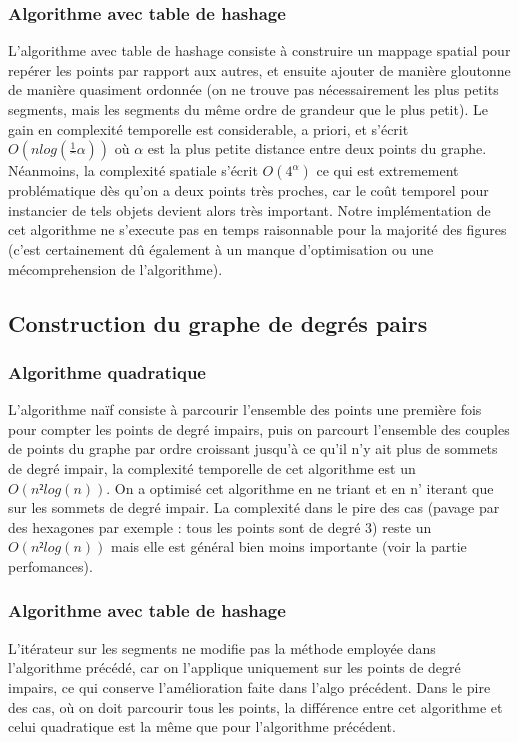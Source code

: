 \documentclass[a4paper,11pt]{article}
\begin{document}
\subsubsection{Algorithme avec table de hashage}

L'algorithme avec table de hashage consiste à construire un mappage spatial pour repérer les points par rapport
aux autres, et ensuite ajouter de manière gloutonne de manière quasiment ordonnée (on ne trouve pas nécessairement
les plus petits segments, mais les segments du même ordre de grandeur que le plus petit). Le gain en complexité temporelle
est considerable, a priori, et s'écrit $O(nlog(\frac{1}^{\alpha}))$ où $\alpha$ est la plus petite distance entre deux points du graphe.
Néanmoins, la complexité spatiale s'écrit $O(4^{\alpha})$ ce qui est extremement problématique dès qu'on a deux points très proches,
car le coût temporel pour instancier de tels objets devient alors très important.
Notre implémentation de cet algorithme ne s'execute pas en temps raisonnable pour la majorité des figures (c'est certainement dû
également à un manque d'optimisation ou une mécomprehension de l'algorithme).
\subsection{Construction du graphe de degrés pairs}

\subsubsection{Algorithme quadratique}

L'algorithme naïf consiste à parcourir l'ensemble des points une première fois pour compter les points de degré impairs,
puis on parcourt l'ensemble des couples de points du graphe par ordre croissant jusqu'à ce qu'il n'y ait plus de sommets de
degré impair, la complexité temporelle de cet algorithme est un $O(n²log(n))$. On a optimisé cet algorithme en ne triant et en n'
iterant que sur les sommets de degré impair. La complexité dans le pire des cas (pavage par des hexagones par exemple : tous les points sont de degré 3) reste un $O(n²log(n))$ mais elle est général bien
moins importante (voir la partie perfomances).

\subsubsection{Algorithme avec table de hashage}

L'itérateur sur les segments ne modifie pas la méthode employée dans l'algorithme précédé, car on
l'applique uniquement sur les points de degré impairs, ce qui conserve l'amélioration faite dans
l'algo précédent. Dans le pire des cas, où on doit parcourir tous les points, la différence entre
cet algorithme et celui quadratique est la même que pour l'algorithme précédent.
\end{document}
